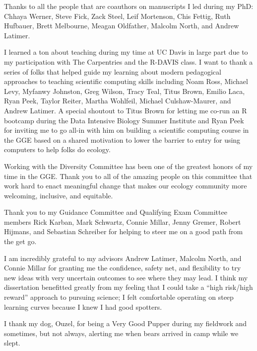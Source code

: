 \documentclass[twoside,12pt,final]{ucthesis-CA2012}
\begin{document}
\begin{ucfrontmatter}
\begin{acknowledgements}
    Thanks to all the people that are coauthors on manuscripts I led during
    my PhD: Chhaya Werner, Steve Fick, Zack Steel, Leif Mortenson, Chis
    Fettig, Ruth Hufbauer, Brett Melbourne, Meagan Oldfather, Malcolm North,
    and Andrew Latimer.
    
    I learned a ton about teaching during my time at UC Davis in large part
    due to my participation with The Carpentries and the R-DAVIS class. I
    want to thank a series of folks that helped guide my learning about
    modern pedagogical approaches to teaching scientific computing skills
    including Noam Ross, Michael Levy, Myfanwy Johnston, Greg Wilson, Tracy
    Teal, Titus Brown, Emilio Laca, Ryan Peek, Taylor Reiter, Martha
    Wohlfeil, Michael Culshaw-Maurer, and Andrew Latimer. A special shoutout
    to Titus Brown for letting me co-run an R bootcamp during the Data
    Intensive Biology Summer Institute and Ryan Peek for inviting me to go
    all-in with him on building a scientific computing course in the GGE
    based on a shared motivation to lower the barrier to entry for using
    computers to help folks do ecology.
    
    Working with the Diversity Committee has been one of the greatest honors
    of my time in the GGE. Thank you to all of the amazing people on this
    committee that work hard to enact meaningful change that makes our
    ecology community more welcoming, inclusive, and equitable.
    
    Thank you to my Guidance Committee and Qualifying Exam Committee members
    Rick Karban, Mark Schwartz, Connie Millar, Jenny Gremer, Robert Hijmans,
    and Sebastian Schreiber for helping to steer me on a good path from the
    get go.
    
    I am incredibly grateful to my advisors Andrew Latimer, Malcolm North,
    and Connie Millar for granting me the confidence, safety net, and
    flexibility to try new ideas with very uncertain outcomes to see where
    they may lead. I think my dissertation benefitted greatly from my
    feeling that I could take a ``high risk/high reward'' approach to
    pursuing science; I felt comfortable operating on steep learning curves
    because I knew I had good spotters.
    
    I thank my dog, Ouzel, for being a Very Good Pupper during my fieldwork
    and sometimes, but not always, alerting me when bears arrived in camp
    while we slept.
    

\end{acknowledgements}
\end{ucfrontmatter}
\end{document}
